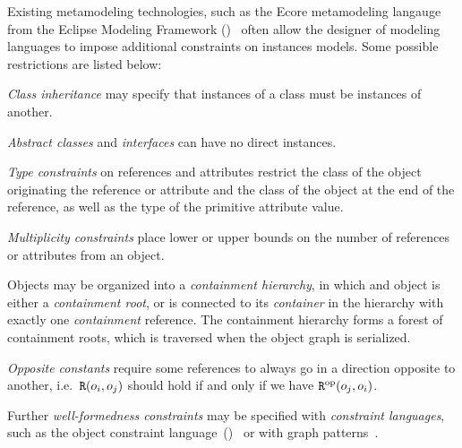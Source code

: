 Existing metamodeling technologies, such as the Ecore metamodeling langauge from the Eclipse Modeling Framework ()~\citep{Steinberg09emf} often allow the designer of modeling languages to impose additional constraints on instances models. Some possible restrictions are listed below: 
\begin{itemize*}
\item \emph{Class inheritance} may specify that instances of a class must be instances of another.
\item \emph{Abstract classes} and \emph{interfaces} can have no direct instances.
\item \emph{Type constraints} on references and attributes restrict the class of the object originating the reference or attribute and the class of the object at the end of the reference, as well as the type of the primitive attribute value.
\item \emph{Multiplicity constraints} place lower or upper bounds on the number of references or attributes from an object.
\item Objects may be organized into a \emph{containment hierarchy}, in which and object is either a \emph{containment root}, or is connected to its \emph{container} in the hierarchy with exactly one \emph{containment} reference. The containment hierarchy forms a forest of containment roots, which is traversed when the object graph is serialized.
\item \emph{Opposite constants} require some references to always go in a direction opposite to another, i.e.~\(\texttt{\upshape R}(o_i, o_j)\) should hold if and only if we have \(\texttt{\upshape R}^{\textrm{op}}(o_j, o_i)\).
\end{itemize*}

Further \emph{well-formedness constraints} may be specified with \emph{constraint languages}, such as the object constraint language~()~\citep{OMG14ocl} or with graph patterns~\citep{Bergmann11validation}.

